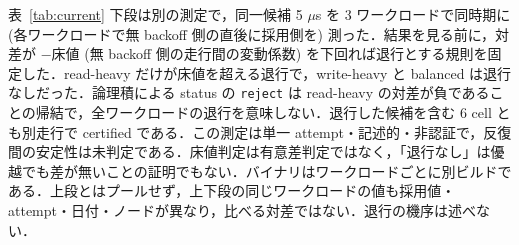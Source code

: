 \documentclass[submit,techrep,noauthor]{ipsj}
\begin{document}
表~\ref{tab:current} 下段は別の測定で，同一候補 5 $\mu$s を 3 ワークロードで同時期に (各ワークロードで無 backoff 側の直後に採用側を) 測った．結果を見る前に，対差が $-$床値 (無 backoff 側の走行間の変動係数) を下回れば退行とする規則を固定した．read-heavy だけが床値を超える退行で，write-heavy と balanced は退行なしだった．論理積による status の \texttt{reject} は read-heavy の対差が負であることの帰結で，全ワークロードの退行を意味しない．退行した候補を含む 6 cell とも別走行で certified である．この測定は単一 attempt・記述的・非認証で，反復間の安定性は未判定である．床値判定は有意差判定ではなく，「退行なし」は優越でも差が無いことの証明でもない．バイナリはワークロードごとに別ビルドである．上段とはプールせず，上下段の同じワークロードの値も採用値・attempt・日付・ノードが異なり，比べる対差ではない．退行の機序は述べない．
\end{document}
